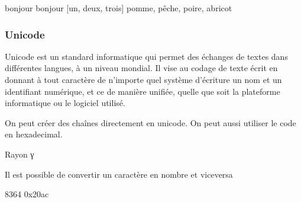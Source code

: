 \documentclass[letterpaper,10pt,english]{sphinxhowto}
\begin{document}
\begin{sphinxVerbatim}[commandchars=\\\{\}]
     bonjour   
bonjour
[\PYGZsq{}un\PYGZsq{}, \PYGZsq{}deux\PYGZsq{}, \PYGZsq{}trois\PYGZsq{}]
pomme, pêche, poire, abricot
\end{sphinxVerbatim}


\subsubsection{Unicode}
\label{\detokenize{cours4_chaine_caractere_cours:unicode}}
\sphinxAtStartPar
Unicode est un standard informatique qui permet des échanges de textes dans différentes langues, à un niveau mondial. Il vise au codage de texte écrit en donnant à tout caractère de n’importe quel système d’écriture un nom et un identifiant numérique, et ce de manière unifiée, quelle que soit la plateforme informatique ou le logiciel utilisé.

\sphinxAtStartPar
On peut créer des chaînes directement en unicode. On peut aussi utiliser le code en hexadecimal.

\begin{sphinxVerbatim}[commandchars=\\\{\}]
  
  
 
\end{sphinxVerbatim}

\begin{sphinxVerbatim}[commandchars=\\\{\}]
Rayon γ
\end{sphinxVerbatim}

\sphinxAtStartPar
Il est possible de convertir un caractère en nombre et vice\sphinxhyphen{}versa

\begin{sphinxVerbatim}[commandchars=\\\{\}]
\end{sphinxVerbatim}

\begin{sphinxVerbatim}[commandchars=\\\{\}]
8364
0x20ac
\end{sphinxVerbatim}
\end{document}
